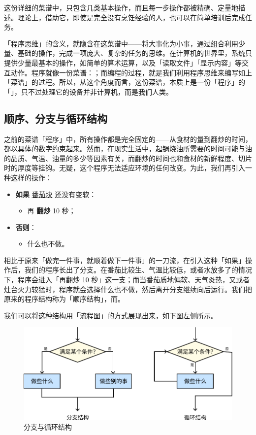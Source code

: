 这份详细的菜谱中，只包含几类基本操作，而且每一步操作都被精确、定量地描述。理论上，借助它，即使是完全没有烹饪经验的人，也可以在简单培训后完成任务。

「程序思维」的含义，就隐含在这菜谱中——将大事化为小事，通过组合利用少量、基础的操作，完成一项庞大、复杂的任务的思维。在计算机的世界里，系统只提供少量最基本的操作，如简单的算术运算，以及「读取文件」「显示内容」等交互动作。程序就像一份菜谱：；而编程的过程，就是我们利用程序思维来编写如上「菜谱」的过程。所以，从这个角度而言，这份菜谱，本质上是一份「程序」的「」，只不过处理它的设备并非计算机，而是我们人类。

\subsection{顺序、分支与循环结构}

之前的菜谱「程序」中，所有操作都是完全固定的——从食材的量到翻炒的时间，都以具体的数字约束起来。然而，在现实生活中，起锅烧油所需要的时间可能与油的品质、气温、油量的多少等因素有关，而翻炒的时间也和食材的新鲜程度、切片时的厚度等挂钩。无疑，这个程序无法适应环境的任何改变。为此，我们再引入一种这样的操作：

\begin{itemize}
  \item \textbf{如果} \underline{番茄块} 还没有变软：
    \begin{itemize}
      \item 再 \textbf{翻炒} 10 秒；
    \end{itemize}
  \item \textbf{否则}：
    \begin{itemize}
      \item 什么也不做。
    \end{itemize}
\end{itemize}

相比于原来「做完一件事，就顺着做下一件事」的一刀流，在引入这种「如果」操作后，我们的程序长出了分支。在番茄比较生、气温比较低，或者水放多了的情况下，程序会进入「再翻炒 10 秒」这一支；而当番茄质地偏软、天气炎热，又或者灶台火力较猛时，程序就会选择什么也不做，然后离开分支继续向后运行。我们把原来的程序结构称为「顺序结构」，而。

我们可以将这种结构用「流程图」的方式展现出来，如下图左侧所示。

\begin{figure}[htb!]
  \centering
  \includegraphics[width=.8\textwidth]{assets/surpass/Branch_and_loop.pdf}
  \caption{分支与循环结构}
  \label{fig:Branch_and_loop}
\end{figure}

